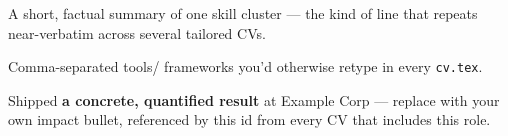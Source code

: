 %
%
%
%
\makeatletter
\newcommand{\defitem}[2]{\expandafter\def\csname cvitem@#1\endcsname{#2}}
\newcommand{\I}[1]{\csname cvitem@#1\endcsname}
\newcommand{\IL}[1]{\@for\@cvx:=#1\do{\csname cvitem@\@cvx\endcsname}}
\makeatother

\defitem{skill.example.core}{\item {} A short, factual
  summary of one skill cluster — the kind of line that repeats near-verbatim
  across several tailored CVs.}
\defitem{skill.example.tools}{\item {} Comma-separated tools/
  frameworks you'd otherwise retype in every \texttt{cv.tex}.}

\defitem{role.example.impact}{\item Shipped \textbf{a concrete, quantified
  result} at Example Corp — replace with your own impact bullet, referenced by
  this id from every CV that includes this role.}
